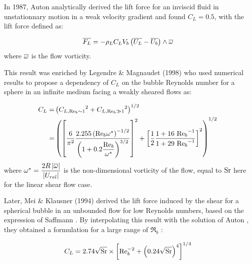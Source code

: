 In 1987, Auton \etal \cite{auton_lift_1987} analytically derived the lift force for an inviscid fluid in unstationnary motion in a weak velocity gradient and found $C_{L}=0.5$, with the lift force defined as:

\begin{equation}
\overline{F_{L}} = - \rho_{L} C_{L} V_{b} \left( \overline{U_{L}} - \overline{U_{b}} \right) \wedge \overline{\omega} 
\end{equation} 
where $\overline{\omega}$ is the flow vorticity.

\npar
This result was enriched by Legendre \& Magnaudet (1998) \cite{legendre_lift_1998} who used numerical results to propose a dependency of $C_{L}$ on the bubble Reynolds number for a sphere in an infinite medium facing a weakly sheared flows as:

\begin{align}
C_{L} =&\left(  {C_{L,\mathrm{Re}_{b} \sim 1}}^{2} + {C_{L,\mathrm{Re}_{b} \gg 1}}^{2}  \right)^{1/2}\\
 =&\left(  \left[ \frac{6}{\pi^{2}} \frac{2.255 \left( \mathrm{Re}_{b}\omega^{*} \right)^{-1/2}}{ \left( 1+0.2\dfrac{\mathrm{Re}_{b}}{\omega^{*}} \right)^{3/2} } \right]^{2} + \left[  \frac{1}{2} \frac{1+16\ {\mathrm{Re}_{b}}^{-1}}{1+29\ {\mathrm{Re}_{b}}^{-1}}  \right]^{2}  \right)^{1/2}
\end{align} 
where $\omega^{*} = \dfrac{2R\left| \overline{\omega} \right|}{\left| U_{rel} \right|}$ is the non-dimensional vorticity of the flow, equal to $\mathrm{Sr}$ here for the linear shear flow case.
%


\npar

Later, Mei \& Klausner (1994) \cite{mei_shear_1994} derived the lift force induced by the shear for a spherical bubble in an unbounded flow for low Reynolds numbers, based on the expression of Saffmann \cite{saffman_lift_1965}. By interpolating this result with the solution of Auton \cite{auton_lift_1987}, they obtained a formulation for a large range of $\Re_{b}$ :

\begin{equation}
C_{L} = 2.74 \sqrt{\mathrm{Sr}} \times \left[ \mathrm{Re}_{b}^{-2} + \left( 0.24\sqrt{\mathrm{Sr}} \right)^{4} \right]^{1/4}
\label{eq:lift_mei}
\end{equation}

